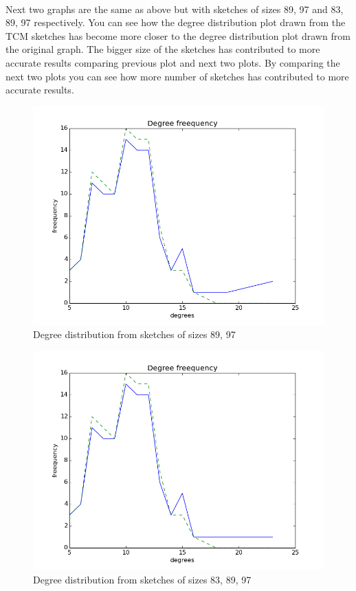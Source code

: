 \documentclass[12pt]{report}
\numberwithin{figure}{section}
\numberwithin{table}{section}
\begin{document}
\paragraph{}

Next two graphs are the same as above but with sketches  of sizes 89, 97 and 83, 89, 97 respectively. You can see how the degree distribution plot drawn from the TCM sketches has become more closer to the degree distribution plot drawn from the original graph. The bigger size of the sketches has contributed to more accurate results comparing previous plot and next two plots. By comparing the next two plots you can see how more number of sketches has contributed to more accurate results.

\begin{figure}[H]
\centering
\includegraphics[scale=0.8]{images/dd2}
\caption{Degree distribution from sketches of sizes 89, 97}
\end{figure}

\begin{figure}[H]
\centering
\includegraphics[scale=0.8]{images/dd3}
\caption{Degree distribution from sketches of sizes 83, 89, 97}
\end{figure}
\end{document}
